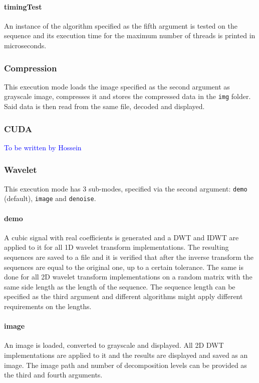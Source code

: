 \paragraph{timingTest} An instance of the algorithm specified as the fifth argument is tested on the sequence and its execution time for the maximum number of threads is printed in microseconds.

\subsubsection{Compression}
This execution mode loads the image specified as the second argument as grayscale image, compresses it and stores the compressed data in the \texttt{img} folder. Said data is then read from the same file, decoded and displayed. 

\subsubsection{CUDA}
\textcolor{blue}{To be written by Hossein}

\subsubsection{Wavelet}
This execution mode has 3 sub-modes, specified via the second argument: \texttt{demo} (default), \texttt{image} and \texttt{denoise}.
\paragraph{demo} A cubic signal with real coefficients is generated and a DWT and IDWT are applied to it for all 1D wavelet transform implementations. The resulting sequences are saved to a file and it is verified that after the inverse transform the sequences are equal to the original one, up to a certain tolerance. The same is done for all 2D wavelet transform implementations on a random matrix with the same side length as the length of the sequence. The sequence length can be specified as the third argument and different algorithms might apply different requirements on the lengths.
\paragraph{image} An image is loaded, converted to grayscale and displayed. All 2D DWT implementations are applied to it and the results are displayed and saved as an image. The image path and number of decomposition levels can be provided as the third and fourth arguments.
